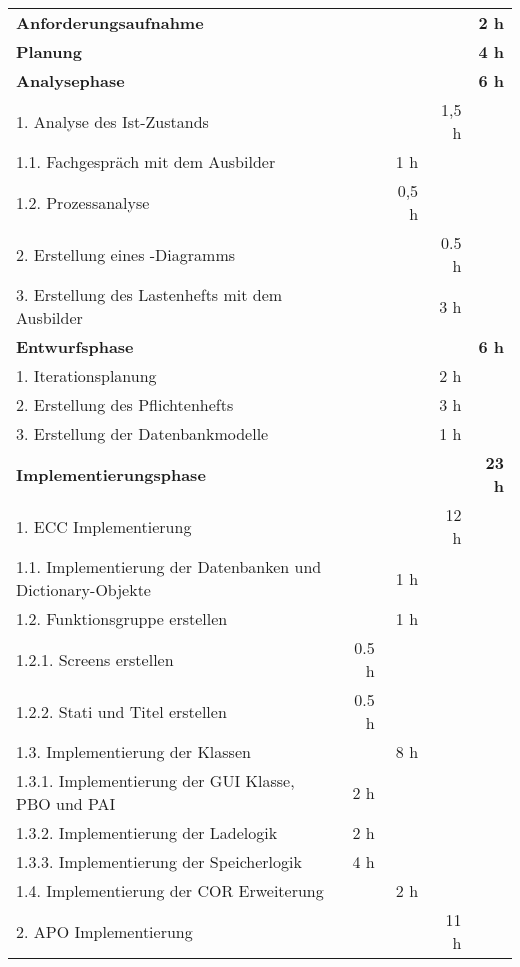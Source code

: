 \begin{tabu}{lrrrr}
\rowfont{\bfseries\leavevmode\color{headingfont}}\textbf{Anforderungsaufnahme} & \textbf{} & \textbf{} & \textbf{} & \textbf{2 h} \\
\rowfont{\bfseries\leavevmode\color{headingfont}}\textbf{Planung} & \textbf{} & \textbf{} & \textbf{} & \textbf{4 h} \\
\rowfont{\bfseries\leavevmode\color{headingfont}}\textbf{Analysephase} & \textbf{} & \textbf{} & \textbf{} & \textbf{6 h} \\
1. Analyse des Ist-Zustands & & & 1,5 h & \\
1.1. Fachgespräch mit dem Ausbilder & & 1 h & & \\
1.2. Prozessanalyse & & 0,5 h & & \\
2. Erstellung eines -Diagramms & & & 0.5 h & \\
3. Erstellung des Lastenhefts mit dem Ausbilder & & & 3 h & \\
\rowfont{\color{headingfont}}\textbf{Entwurfsphase} & \textbf{} & \textbf{} & \textbf{} & \textbf{6 h} \\
1. Iterationsplanung & & & 2 h & \\
2. Erstellung des Pflichtenhefts & & & 3 h & \\
3. Erstellung der Datenbankmodelle & & & 1 h & \\
\rowfont{\color{headingfont}}\textbf{Implementierungsphase} & \textbf{} & \textbf{} & \textbf{} & \textbf{23 h} \\
1. ECC Implementierung & & & 12 h & \\
1.1. Implementierung der Datenbanken und Dictionary-Objekte & & 1 h & & \\
1.2. Funktionsgruppe erstellen & & 1 h & \\
1.2.1. Screens erstellen & 0.5 h & & & \\
1.2.2. Stati und Titel erstellen & 0.5 h & & & \\
1.3. Implementierung der Klassen & & 8 h & & \\
1.3.1. Implementierung der GUI Klasse, PBO und PAI & 2 h & & & \\
1.3.2. Implementierung der Ladelogik & 2 h & & & \\
1.3.3. Implementierung der Speicherlogik & 4 h & & & \\
1.4. Implementierung der COR Erweiterung & & 2 h & & \\
2. APO Implementierung & & & 11 h & \\

\end{tabu}

